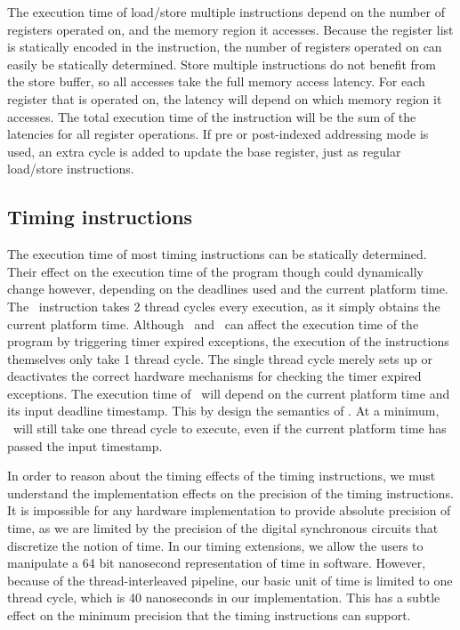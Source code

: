 The execution time of load/store multiple instructions depend on the number of registers operated on, and the memory region it accesses. 
Because the register list is statically encoded in the instruction, the number of registers operated on can easily be statically determined.
Store multiple instructions do not benefit from the store buffer, so all accesses take the full memory access latency.
For each register that is operated on, the latency will depend on which memory region it accesses. 
The total execution time of the instruction will be the sum of the latencies for all register operations. 
If pre or post-indexed addressing mode is used, an extra cycle is added to update the base register, just as regular load/store instructions. 

\subsection{Timing instructions}
The execution time of most timing instructions can be statically determined. 
Their effect on the execution time of the program though could dynamically change however, depending on the deadlines used and the current platform time.
The \gettime\ instruction takes 2 thread cycles every execution, as it simply obtains the current platform time.
Although \exceptiononexpire\ and \deactivateexception\ can affect the execution time of the program by triggering timer expired exceptions, the execution of the instructions themselves only take 1 thread cycle.
The single thread cycle merely sets up or deactivates the correct hardware mechanisms for checking the timer expired exceptions.  
The execution time of \delayuntil\ will depend on the current platform time and its input deadline timestamp.
This by design the semantics of \delayuntil. 
At a minimum, \delayuntil\ will still take one thread cycle to execute, even if the current platform time has passed the input timestamp.

In order to reason about the timing effects of the timing instructions, we must understand the implementation effects on the precision of the timing instructions.
It is impossible for any hardware implementation to provide absolute precision of time, as we are limited by the precision of the digital synchronous circuits that discretize the notion of time. 
In our timing extensions, we allow the users to manipulate a 64 bit nanosecond representation of time in software. 
However, because of the thread-interleaved pipeline, our basic unit of time is limited to one thread cycle, which is 40 nanoseconds in our implementation.
This has a subtle effect on the minimum precision that the timing instructions can support.
   

